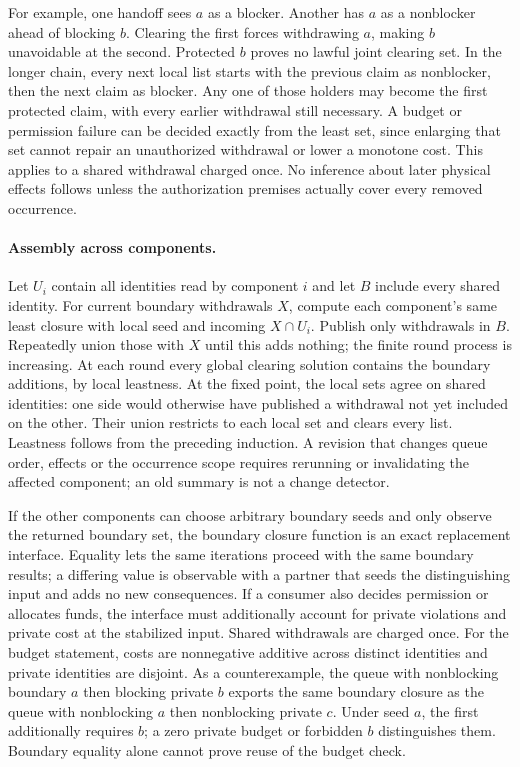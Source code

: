 \documentclass[11pt]{article}
\begin{document}
For example, one handoff sees $a$ as a blocker. Another has $a$ as a nonblocker ahead of blocking $b$. Clearing the first forces withdrawing $a$, making $b$ unavoidable at the second. Protected $b$ proves no lawful joint clearing set. In the longer chain, every next local list starts with the previous claim as nonblocker, then the next claim as blocker. Any one of those holders may become the first protected claim, with every earlier withdrawal still necessary. A budget or permission failure can be decided exactly from the least set, since enlarging that set cannot repair an unauthorized withdrawal or lower a monotone cost. This applies to a shared withdrawal charged once. No inference about later physical effects follows unless the authorization premises actually cover every removed occurrence.

\paragraph{Assembly across components.}
Let $U_i$ contain all identities read by component $i$ and let $B$ include every shared identity. For current boundary withdrawals $X$, compute each component's same least closure with local seed and incoming $X\cap U_i$. Publish only withdrawals in $B$. Repeatedly union those with $X$ until this adds nothing; the finite round process is increasing. At each round every global clearing solution contains the boundary additions, by local leastness. At the fixed point, the local sets agree on shared identities: one side would otherwise have published a withdrawal not yet included on the other. Their union restricts to each local set and clears every list. Leastness follows from the preceding induction. A revision that changes queue order, effects or the occurrence scope requires rerunning or invalidating the affected component; an old summary is not a change detector.

If the other components can choose arbitrary boundary seeds and only observe the returned boundary set, the boundary closure function is an exact replacement interface. Equality lets the same iterations proceed with the same boundary results; a differing value is observable with a partner that seeds the distinguishing input and adds no new consequences. If a consumer also decides permission or allocates funds, the interface must additionally account for private violations and private cost at the stabilized input. Shared withdrawals are charged once. For the budget statement, costs are nonnegative additive across distinct identities and private identities are disjoint. As a counterexample, the queue with nonblocking boundary $a$ then blocking private $b$ exports the same boundary closure as the queue with nonblocking $a$ then nonblocking private $c$. Under seed $a$, the first additionally requires $b$; a zero private budget or forbidden $b$ distinguishes them. Boundary equality alone cannot prove reuse of the budget check.
\end{document}
